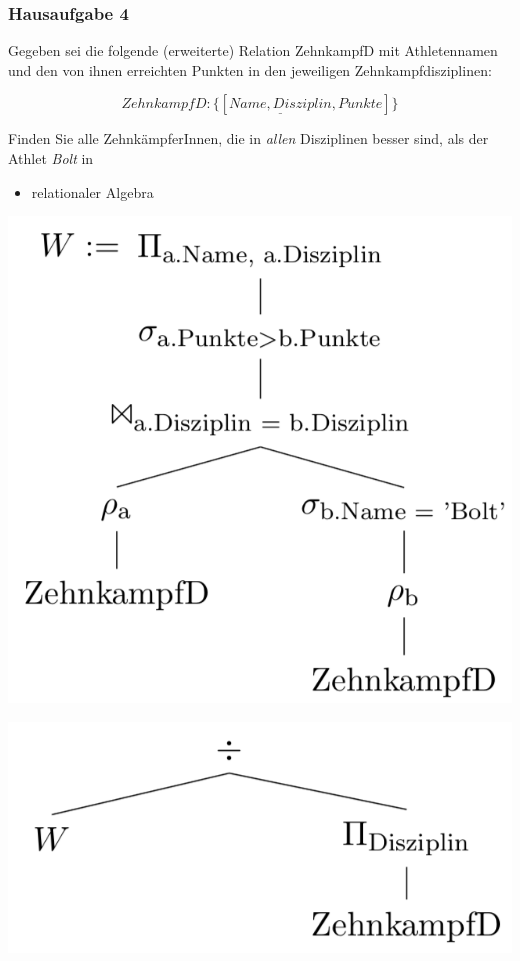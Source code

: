 \begin{frame}[fragile]
	\frametitle{Hausaufgabe 4}
	\vspace{0.5cm}

	\begin{multicols}{2}
		Gegeben sei die folgende (erweiterte) Relation ZehnkampfD mit 
		Athletennamen und den von ihnen erreichten Punkten in den jeweiligen Zehnkampfdisziplinen:

		\[ ZehnkampfD: \{[ \underline{Name, Disziplin}, Punkte ]\} \]

		Finden Sie alle ZehnkämpferInnen, die in \textit{allen} Disziplinen besser sind,
		als der Athlet \textit{Bolt} in
		\begin{itemize}
			\item relationaler Algebra
		\end{itemize}
		\vfill\columnbreak

		\begin{center}
			\includegraphics[height=.4\paperheight]{./4-a-1.png}
		\end{center}
		\pause 
		\begin{center}
			\includegraphics[height=.2\paperheight]{./4-a-2.png}
		\end{center}
	\end{multicols}
\end{frame}


